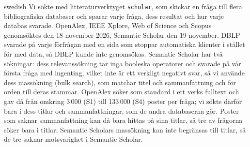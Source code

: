 \begin{onlyin}{swedish}
Vi sökte med litteraturverktyget \texttt{scholar}, som skickar en fråga
till flera bibliografiska databaser och sparar varje fråga, dess resultat
och hur varje databas svarade.  OpenAlex, IEEE Xplore, Web of Science och
Scopus genomsöktes den 18 november 2026, Semantic Scholar den 19
november.  DBLP svarade på varje förfrågan med en sida som stoppar
automatiska klienter i stället för med data, så DBLP kunde inte
genomsökas.  Semantic Scholar har två sökningar: dess relevanssökning tar
inga booleska operatorer och svarade på vår första fråga med ingenting,
vilket inte är ett verkligt negativt svar, så vi använde dess
massökning (\foreignlanguage{english}{bulk search}), som matchar titel och
sammanfattning och för orden till deras
stammar.  OpenAlex söker som standard i ett verks fulltext och gav då
från omkring 3\,000 (S1) till 133\,000 (S4) poster per fråga; vi sökte
därför bara i dess titlar och sammanfattningar, som de andra databaserna
gör.  Poster som saknar sammanfattning kan då bara hittas på sina titlar,
så tre av frågorna söker bara i titlar; Semantic Scholars massökning kan
inte begränsas till titlar, så de tre saknar motsvarighet i Semantic
Scholar.


\end{onlyin}
